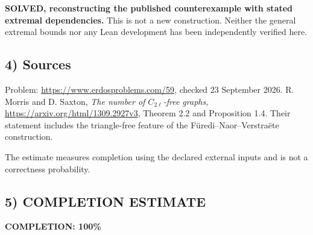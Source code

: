 \textbf{SOLVED, reconstructing the published counterexample with stated extremal dependencies.} This is not a new construction. Neither the general extremal bounds nor any Lean development has been independently verified here.

\subsection*{4) Sources}
Problem: \url{https://www.erdosproblems.com/59}, checked 23 September 2026. R. Morris and D. Saxton, \emph{The number of $C_{2\ell}$-free graphs}, \url{https://arxiv.org/html/1309.2927v3}, Theorem 2.2 and Proposition 1.4. Their statement includes the triangle-free feature of the F\"uredi--Naor--Verstra\"ete construction.

The estimate measures completion using the declared external inputs and is not a correctness probability.
\subsection*{5) COMPLETION ESTIMATE}
\textbf{COMPLETION: 100\%}
